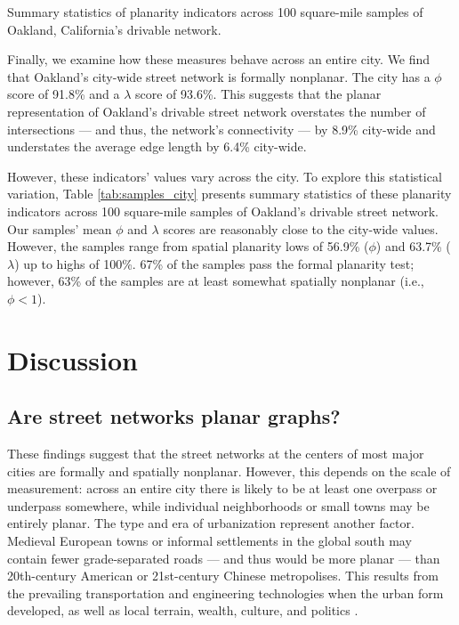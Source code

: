\documentclass[Afour,sageh,times]{sagej}
\begin{document}
\begin{table}[htbp]
	\centering
	\caption{Summary statistics of planarity indicators across 100 square-mile samples of Oakland, California's drivable network.}
	\label{tab:samples_city}
	
\end{table}

Finally, we examine how these measures behave across an entire city. We find that Oakland's city-wide street network is formally nonplanar. The city has a $\phi$ score of 91.8\% and a $\lambda$ score of 93.6\%. This suggests that the planar representation of Oakland's drivable street network overstates the number of intersections --- and thus, the network's connectivity --- by 8.9\% city-wide and understates the average edge length by 6.4\% city-wide.

However, these indicators' values vary across the city. To explore this statistical variation, Table \ref{tab:samples_city} presents summary statistics of these planarity indicators across 100 square-mile samples of Oakland's drivable street network. Our samples' mean $\phi$ and $\lambda$ scores are reasonably close to the city-wide values. However, the samples range from spatial planarity lows of 56.9\% ($\phi$) and 63.7\% ($\lambda$) up to highs of 100\%. 67\% of the samples pass the formal planarity test; however, 63\% of the samples are at least somewhat spatially nonplanar (i.e., $\phi < 1$).



\section{Discussion}

\subsection{Are street networks planar graphs?}

These findings suggest that the street networks at the centers of most major cities are formally and spatially nonplanar. However, this depends on the scale of measurement: across an entire city there is likely to be at least one overpass or underpass somewhere, while individual neighborhoods or small towns may be entirely planar. The type and era of urbanization represent another factor. Medieval European towns or informal settlements in the global south may contain fewer grade-separated roads --- and thus would be more planar --- than 20th-century American or 21st-century Chinese metropolises. This results from the prevailing transportation and engineering technologies when the urban form developed, as well as local terrain, wealth, culture, and politics \citep{southworth_street_1995}.
\end{document}
